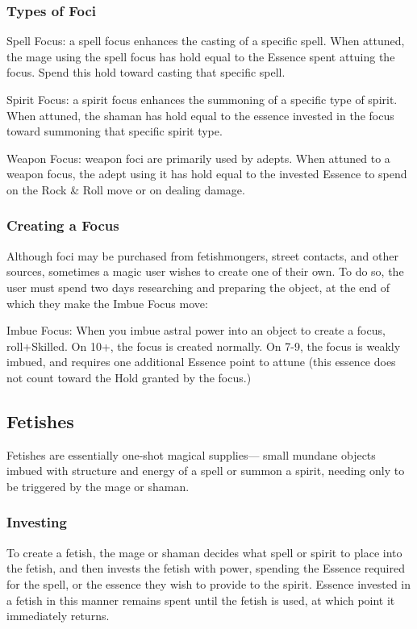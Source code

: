 \subsubsection{Types of Foci}
Spell Focus: a spell focus enhances the casting of a specific spell. When attuned, the mage using the spell focus has hold equal to the Essence spent attuing the focus. Spend this hold toward casting that specific spell.

Spirit Focus: a spirit focus enhances the summoning of a specific type of spirit. When attuned, the shaman has hold equal to the essence invested in the focus toward summoning that specific spirit type.

Weapon Focus: weapon foci are primarily used by adepts. When attuned to a weapon focus, the adept using it has hold equal to the invested Essence to spend on the Rock \& Roll move or on dealing damage.

\subsubsection{Creating a Focus}
Although foci may be purchased from fetishmongers, street contacts, and other sources, sometimes a magic user wishes to create one of their own. To do so, the user must spend two days researching and preparing the object, at the end of which they make the Imbue Focus move:

Imbue Focus: When you imbue astral power into an object to create a focus, roll+Skilled. On 10+, the focus is created normally. On 7-9, the focus is weakly imbued, and requires one additional Essence point to attune (this essence does not count toward the Hold granted by the focus.)


\subsection{Fetishes}

Fetishes are essentially one-shot magical supplies— small mundane objects imbued with structure and energy of a spell or summon a spirit, needing only to be triggered by the mage or shaman.

\subsubsection{Investing}
To create a fetish, the mage or shaman decides what spell or spirit to place into the fetish, and then invests the fetish with power, spending the Essence required for the spell, or the essence they wish to provide to the spirit. Essence invested in a fetish in this manner remains spent until the fetish is used, at which point it immediately returns.

